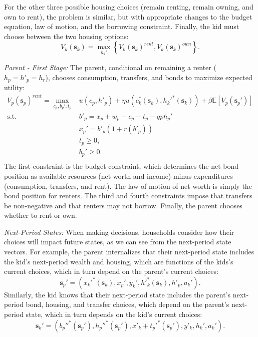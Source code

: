 \documentclass[12pt]{article}
\newcommand{\E}{\mathbb{E}}
\begin{document}
For the other three possible housing choices (remain renting, remain owning, and own to rent), the problem is similar, but with appropriate changes to the budget equation, law of motion, and the borrowing constraint. Finally, the kid must choose between the two housing options:
\begin{equation}
	V_k(\mathbf{s}_k) = \max_{h_k'} \left\{V_k(\mathbf{s}_k)^{rent},V_k(\mathbf{s}_k)^{own}\right\}.
\end{equation}

\textit{Parent - First Stage:} The parent, conditional on remaining a renter ($h_p=h'_p=h_r$), chooses consumption, transfers, and bonds to maximize expected utility:
\begin{equation}\label{eq:Vp}
\begin{split}
V_p(\mathbf{s}_p)^{rent} = \max_{c_p,b_p',t_p} & u(c_p,h'_p) + {\eta} u\left (c_k^*({\mathbf{s}_k}),h_k'^*({\mathbf{s}_k})\right )  +  \beta \E \left[V_{p}({\mathbf{s}_p'})\right] \\
\text{s.t.}\quad  & b'_p = x_p + w_p - c_p - t_p - q p h_p'\\
& x_p' = b'_p(1+r(b'_p)) \\
& t_p\ge0, \\
& b_p'\ge 0. \\
\end{split}
\end{equation}
The first constraint is the budget constraint, which determines the net bond position as available resources (net worth and income) minus expenditures (consumption, transfers, and rent). The law of motion of net worth is simply the bond position for renters. The third and fourth constraints impose that transfers be non-negative and that renters may not borrow. Finally, the parent chooses whether to rent or own.

\textit{Next-Period States:}
When making decisions, households consider how their choices will impact future states, as we can see from the next-period state vectors. For example, the parent internalizes that their next-period state includes the kid's next-period wealth and housing, which are functions of the kids's current choices, which in turn depend on the parent's current choices:
\begin{equation}
	\mathbf{s}_p' = \left(x_k'^{*}({\mathbf{s}_k}),x_p',y_k',h'^*_k({\mathbf{s}_k}),h'_p,a_k'\right).
\end{equation}
Similarly, the kid knows that their next-period state includes the parent's next-period bond, housing, and transfer choices, which depend on the parent's next-period state, which in turn depends on the kid's current choices:
\begin{equation}
	\mathbf{s}_k' = (b_p''^*({\mathbf{s}_p'}),h_p''^*({\mathbf{s}_p'}),x'_k + t_p'^*({\mathbf{s}_p'}),y'_k,h_k',a_k').
\end{equation}
	
\end{document}

